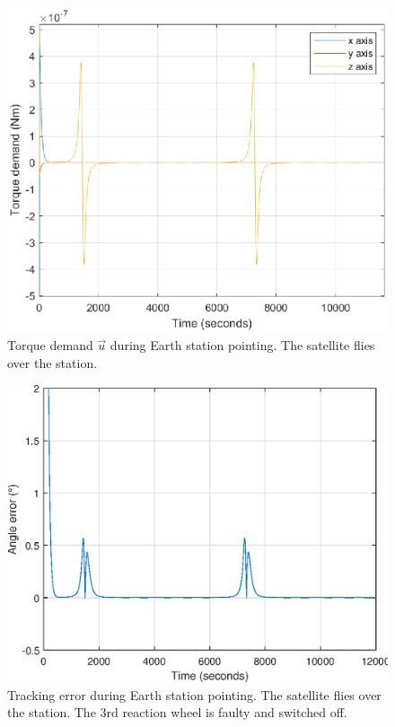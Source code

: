 \begin{figure}[H]
	\centering
	\includegraphics[width=0.7\linewidth]{figures/torque_stationTrack}
	\caption{Torque demand $\vec{u}$ during Earth station pointing. The satellite flies over the station.}
	\label{fig:torque_stationTrack}
\end{figure}

\begin{figure}[H]
	\centering
	\includegraphics[width=0.7\linewidth]{figures/faultyangerror}
	\caption{Tracking error during Earth station pointing. The satellite flies over the station. The 3rd reaction wheel is faulty and switched off.}
	\label{fig:angle_error2}
\end{figure}


